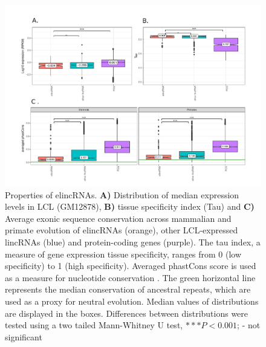 \documentclass[11pt,a4paper]{report}
\begin{document}
\begin{figure}[ht]
	\includegraphics[width=1\textwidth]{Figures/1_full_characterization_elincRNA.pdf}
	\caption{Properties of elincRNAs. \textbf{A)} Distribution of median expression levels in LCL (GM12878), \textbf{B)} tissue specificity index (Tau) and \textbf{C)} Average exonic sequence conservation across mammalian and primate evolution of elincRNAs (orange), other LCL-expressed lincRNAs (blue) and protein-coding genes (purple). The tau index, a measure of gene expression tissue specificity, ranges from 0 (low specificity) to 1 (high specificity)\cite{Kryuchkova2015a}. Averaged phastCons score is used as a measure for nucleotide conservation \cite{Siepel2005}. The green horizontal line represents the median conservation of ancestral repeats, which are used as a proxy for neutral evolution. Median values of distributions are displayed in the boxes. Differences between distributions were tested using a two tailed Mann-Whitney U test, $***P<0.001$; - not significant}
	\label{charac_elinc}
\end{figure}
\end{document}
